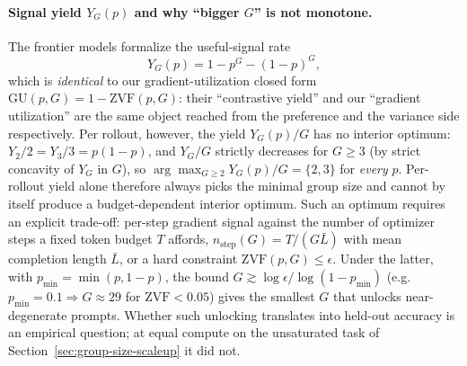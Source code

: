 \paragraph{Signal yield $Y_G(p)$ and why ``bigger $G$'' is not monotone.}
The frontier models formalize the useful-signal rate
\begin{equation}
  Y_G(p) = 1 - p^G - (1-p)^G,
  \label{eq:fs-yield}
\end{equation}
which is \emph{identical} to our gradient-utilization closed form
$\mathrm{GU}(p,G) = 1 - \mathrm{ZVF}(p,G)$: their ``contrastive yield''
and our ``gradient utilization'' are the same object reached from the
preference and the variance side respectively. Per rollout,
however, the yield $Y_G(p)/G$ has no interior optimum:
$Y_2/2=Y_3/3=p(1-p)$, and $Y_G/G$ strictly decreases for $G\ge3$
(by strict concavity of $Y_G$ in $G$), so
$\arg\max_{G\ge2}Y_G(p)/G=\{2,3\}$ for \emph{every} $p$.
Per-rollout yield alone therefore always picks the minimal group
size and cannot by itself produce a budget-dependent interior optimum. Such an optimum requires an
explicit trade-off: per-step gradient signal against the number of optimizer steps a
fixed token budget $T$ affords,
$n_\mathrm{step}(G)=T/(G\bar L)$ with mean completion length
$\bar L$, or a hard constraint $\mathrm{ZVF}(p,G)\le\epsilon$.
Under the latter, with $p_{\min}=\min(p,1-p)$, the bound
$G\gtrsim\log\epsilon/\log(1-p_{\min})$ (e.g.\
$p_{\min}{=}0.1\Rightarrow G\approx29$ for $\mathrm{ZVF}<0.05$)
gives the smallest $G$ that unlocks near-degenerate prompts.
Whether such unlocking translates into held-out accuracy is an empirical
question; at equal compute on the unsaturated task of
Section~\ref{sec:group-size-scaleup} it did not.

